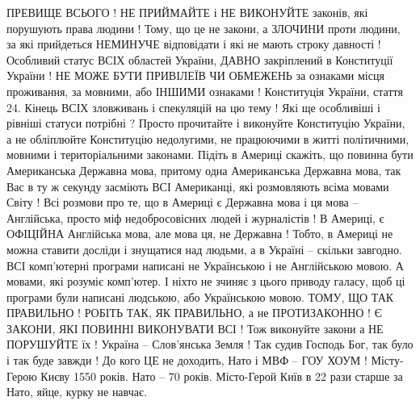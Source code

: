 \begin{itemize}
ПРЕВИЩЕ ВСЬОГО ! НЕ ПРИЙМАЙТЕ і НЕ ВИКОНУЙТЕ законів, які порушують права
людини ! Тому, що це не закони, а ЗЛОЧИНИ проти людини, за які прийдеться
НЕМИНУЧЕ відповідати і які не мають строку давності ! Особливий статус ВСІХ
областей України, ДАВНО закріплений в Конституції України ! НЕ МОЖЕ БУТИ
ПРИВІЛЕЇВ ЧИ ОБМЕЖЕНЬ за ознаками місця проживання, за мовними, або ІНШИМИ
ознаками ! Конституція України, стаття 24. Кінець ВСІХ зловживань і спекуляцій
на цю тему ! Які ще особливіші і рівніші статуси потрібні ? Просто прочитайте і
виконуйте Конституцію України, а не обліплюйте Конституцію недолугими, не
працюючими в житті політичними, мовними і територіальними законами. Підіть в
Америці скажіть, що повинна бути Американська Державна мова, притому одна
Американська Державна мова, так Вас в ту ж секунду засміють ВСІ Американці, які
розмовляють всіма мовами Світу ! Всі розмови про те, що в Америці є Державна
мова і ця мова – Англійська, просто міф недобросовісних людей і журналістів ! В
Америці, є ОФІЦІЙНА Англійська мова, але мова ця, не Державна ! Тобто, в
Америці не можна ставити досліди і знущатися над людьми, а в Україні – скільки
завгодно. ВСІ комп’ютерні програми написані не Українською і не Англійською
мовою. А мовами, які розуміє комп’ютер. І ніхто не зчиняє з цього приводу
галасу, щоб ці програми були написані людською, або Українською мовою. ТОМУ, ЩО
ТАК ПРАВИЛЬНО ! РОБІТЬ ТАК, ЯК ПРАВИЛЬНО, а не ПРОТИЗАКОННО ! Є ЗАКОНИ, ЯКІ
ПОВИННІ ВИКОНУВАТИ ВСІ ! Тож виконуйте закони а НЕ ПОРУШУЙТЕ їх ! Україна –
Слов’янська Земля ! Так судив Господь Бог, так було і так буде завжди ! До кого
ЦЕ не доходить, Нато і МВФ – ГОУ ХОУМ ! Місту-Герою Києву 1550 років. Нато – 70
років. Місто-Герой Київ в 22 рази старше за Нато, яйце, курку не навчає.

\end{itemize}
